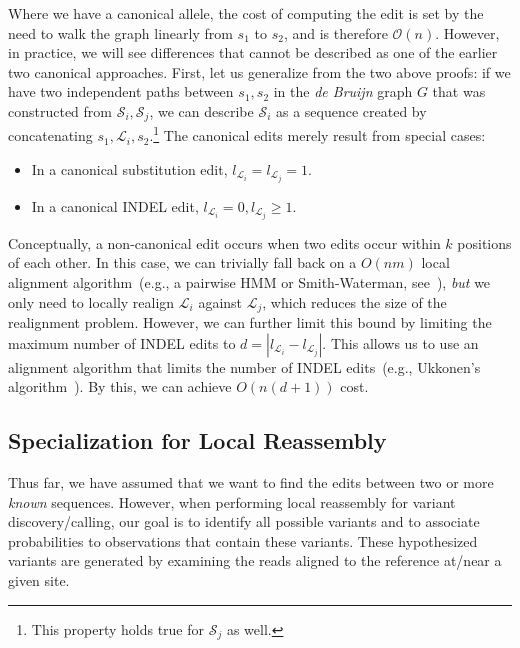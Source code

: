 \documentclass[masters]{ucbthesis}
\begin{document}
Where we have a canonical allele, the cost of computing the edit is set by the need to walk the graph
linearly from $s_1$ to $s_2$, and is therefore $\mathcal{O}(n)$. However, in practice, we will see
differences that cannot be described as one of the earlier two canonical approaches. First, let us
generalize from the two above proofs: if we have two independent paths between $s_1, s_2$ in the
\emph{de Bruijn} graph $G$ that was constructed from $\mathcal{S}_i, \mathcal{S}_j$, we can describe
$\mathcal{S}_i$ as a sequence created by concatenating $s_1, \mathcal{L}_i, s_2$.\footnote{This
property holds true for $\mathcal{S}_j$ as well.} The canonical edits merely result from special cases:

\begin{itemize}
\item In a canonical substitution edit, $l_{\mathcal{L}_i} = l_{\mathcal{L}_j} = 1$.
\item In a canonical INDEL edit, $l_{\mathcal{L}_i} = 0, l_{\mathcal{L}_j} \ge 1$.
\end{itemize}

Conceptually, a non-canonical edit occurs when two edits occur within $k$ positions of each other. In
this case, we can trivially fall back on a $O(nm)$ local alignment algorithm~(e.g., a pairwise HMM or
Smith-Waterman, see~\cite{durbin98,smith81}), \emph{but} we only need to locally realign
$\mathcal{L}_i$ against $\mathcal{L}_j$, which reduces the size of the realignment problem. However, we
can further limit this bound by limiting the maximum number of INDEL edits to $d = | l_{\mathcal{L}_i} -
l_{\mathcal{L}_j} |$. This allows us to use an alignment algorithm that limits the number of INDEL
edits~(e.g., Ukkonen's algorithm~\cite{ukkonen85}). By this, we can achieve $O(n(d + 1))$ cost.

\subsection{Specialization for Local Reassembly}
\label{sec:local-reassembly}

Thus far, we have assumed that we want to find the edits between two or
more \emph{known} sequences. However, when performing local reassembly for variant discovery/calling,
our goal is to identify all possible variants and to associate probabilities to observations that contain these
variants. These hypothesized variants are generated by examining the reads aligned to the reference
at/near a given site.
\end{document}
